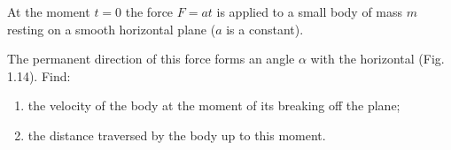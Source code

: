 \item At the moment \( t = 0 \) the force \( F = at \) is applied to a small body of mass \( m \) resting on a smooth horizontal plane (\( a \) is a constant).
    \begin{center}
    \end{center}
    The permanent direction of this force forms an angle \( \alpha \) with the horizontal (Fig. 1.14). Find:
    \begin{enumerate}
        \item the velocity of the body at the moment of its breaking off the plane;
        \item the distance traversed by the body up to this moment.
    \end{enumerate}